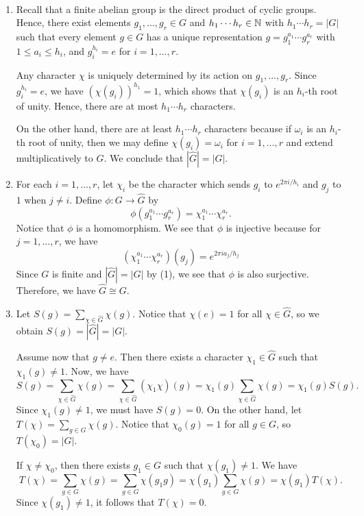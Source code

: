 \begin{pf}~
    \begin{enumerate}[(1)]
        \item Recall that a finite abelian group is the direct product of cyclic 
        groups. Hence, there exist elements $g_1, \dots, g_r \in G$ and 
        $h_1 \cdots h_r \in \mathbb{N}$ with $h_1 \cdots h_r = |G|$ such that 
        every element $g \in G$ has a unique representation $g = g_1^{a_1} 
        \cdots g_r^{a_r}$ with $1 \leq a_i \leq h_i$, and $g_i^{h_i} = e$ for 
        $i = 1, \dots, r$. 

        Any character $\chi$ is uniquely determined by its action on 
        $g_1, \dots, g_r$. Since $g_i^{h_i} = e$, we have $(\chi(g_i))^{h_1} = 1$, 
        which shows that $\chi(g_i)$ is an $h_i$-th root of unity. Hence, there are 
        at most $h_1 \cdots h_r$ characters. 

        On the other hand, there are at least $h_1 \cdots h_r$ characters because 
        if $\omega_i$ is an $h_i$-th root of unity, then we may define $\chi(g_i)
        = \omega_i$ for $i = 1, \dots, r$ and extend multiplicatively to $G$. 
        We conclude that $|\hat G| = |G|$. 

        \item For each $i = 1, \dots, r$, let $\chi_i$ be the character 
        which sends $g_i$ to $e^{2\pi i/h_i}$ and $g_j$ to $1$ when $j \neq i$. 
        Define $\phi : G \to \hat G$ by 
        \[ \phi(g_1^{a_1} \cdots g_r^{a_r}) = \chi_1^{a_1} \cdots \chi_r^{a_r}. \] 
        Notice that $\phi$ is a homomorphism. We see that $\phi$ is injective 
        because for $j = 1, \dots, r$, we have 
        \[ (\chi_1^{a_1} \cdots \chi_r^{a_r})(g_j) = e^{2\pi ia_j/h_j} \] 
        Since $G$ is finite and $|\hat G| = |G|$ by (1), 
        we see that $\phi$ is also surjective. Therefore, we have $\hat G \cong G$. 

        \item Let $S(g) = \sum_{\chi\in\hat G} \chi(g)$. Notice that 
        $\chi(e) = 1$ for all $\chi \in \hat G$, so we obtain $S(g) = |\hat G| = |G|$. 

        Assume now that $g \neq e$. Then there exists a character $\chi_1 \in \hat G$ 
        such that $\chi_1(g) \neq 1$. Now, we have 
        \[ S(g) = \sum_{\chi \in \hat G} \chi(g) = \sum_{\chi \in \hat G} (\chi_1\chi)(g) 
        = \chi_1(g) \sum_{\chi\in\hat G} \chi(g) = \chi_1(g) S(g). \] 
        Since $\chi_1(g) \neq 1$, we must have $S(g) = 0$. 
        \newpage 
        On the other hand, let $T(\chi) = \sum_{g \in G} \chi(g)$. Notice that $\chi_0(g) 
        = 1$ for all $g \in G$, so $T(\chi_0) = |G|$. 
        
        If $\chi \neq \chi_0$, then there exists $g_1 \in G$ such that $\chi(g_1) 
        \neq 1$. We have 
        \[ T(\chi) = \sum_{g \in G} \chi(g) = \sum_{g \in G} \chi(g_1g) = 
        \chi(g_1) \sum_{g \in G} \chi(g) = \chi(g_1) T(\chi). \] 
        Since $\chi(g_1) \neq 1$, it follows that $T(\chi) = 0$. \qedhere 
    \end{enumerate}
\end{pf}

